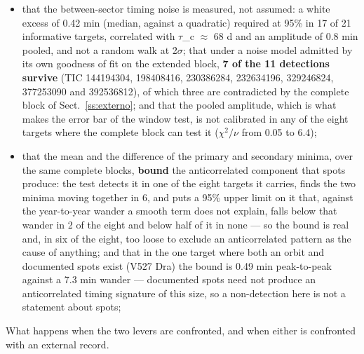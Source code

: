 \documentclass{aa}
\begin{document}
\begin{itemize}
\item that the between-sector timing noise is measured, not assumed: a white excess of 0.42 min (median, against a quadratic) required at 95\% in 17 of 21 informative targets, correlated with $\tau$\_c $\approx$ 68 d and an amplitude of 0.8 min pooled, and not a random walk at 2$\sigma$; that under a noise model admitted by its own goodness of fit on the extended block, \textbf{7 of the 11 detections survive} (TIC 144194304, 198408416, 230386284, 232634196, 329246824, 377253090 and 392536812), of which three are contradicted by the complete block of Sect.~\ref{ss:externo}; and that the pooled amplitude, which is what makes the error bar of the window test, is not calibrated in any of the eight targets where the complete block can test it ($\chi^2/\nu$ from 0.05 to 6.4);
\item that the mean and the difference of the primary and secondary minima, over the same complete blocks, \textbf{bound} the anticorrelated component that spots produce: the test detects it in one of the eight targets it carries, finds the two minima moving together in 6, and puts a 95\% upper limit on it that, against the year-to-year wander a smooth term does not explain, falls below that wander in 2 of the eight and below half of it in none --- so the bound is real and, in six of the eight, too loose to exclude an anticorrelated pattern as the cause of anything; and that in the one target where both an orbit and documented spots exist (V527 Dra) the bound is 0.49 min peak-to-peak against a 7.3 min wander --- documented spots need not produce an anticorrelated timing signature of this size, so a non-detection here is not a statement about spots;
\end{itemize}

What happens when the two levers are confronted, and when either is confronted with an external record.
\end{document}
